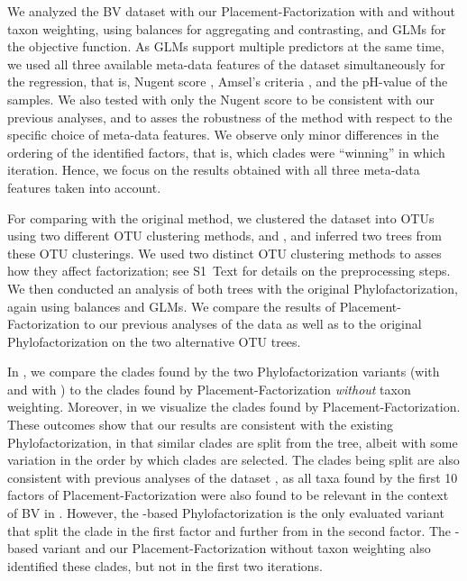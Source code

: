 We analyzed the \ac{BV} dataset \cite{Srinivasan2012} with our Placement-Factorization with and without taxon weighting,
using balances for aggregating and contrasting, and \acp{GLM} for the objective function.
As \acp{GLM} support multiple predictors at the same time,
we used all three available meta-data features of the dataset simultaneously for the regression,
that is, Nugent score \cite{Nugent1991}, Amsel's criteria \cite{Amsel1983}, and the pH-value of the samples.
We also tested with only the Nugent score to be consistent with our previous analyses,
and to asses the robustness of the method with respect to the specific choice of meta-data features.
We observe only minor differences in the ordering of the identified factors,
that is, which clades were ``winning'' in which iteration.
Hence, we focus on the results obtained with all three meta-data features taken into account.

For comparing with the original method, we clustered the dataset into OTUs using two different OTU clustering methods,
 \cite{Rognes2016} and  \cite{Mahe2014,Mahe2015},
and inferred two trees from these OTU clusterings.
We used two distinct OTU clustering methods to asses how they affect factorization;
see S1~Text for details on the preprocessing steps.
We then conducted an analysis of both trees with the original Phylofactorization,
again using balances and \acp{GLM}.
We compare the results of Placement-Factorization to our previous analyses of the data
as well as to the original Phylofactorization on the two alternative OTU trees.

In , we compare the clades found by the two Phylofactorization variants
(with  and with )
to the clades found by Placement-Factorization \emph{without} taxon weighting.
Moreover, in  we visualize the clades found by Placement-Factorization.
These outcomes show that our results are consistent with the existing Phylofactorization,
in that similar clades are split from the tree,
albeit with some variation in the order by which clades are selected. %
The clades being split are also consistent with previous analyses of the dataset \cite{Srinivasan2012},
as all taxa found by the first \num{10} factors of Placement-Factorization
were also found to be relevant in the context of \acl{BV} in \cite{Srinivasan2012}.
However, the -based Phylofactorization is the only evaluated variant
that split the  clade in the first factor
and further  from  in the second factor.
The -based variant and our Placement-Factorization without taxon weighting also identified these clades,
but not in the first two iterations.

